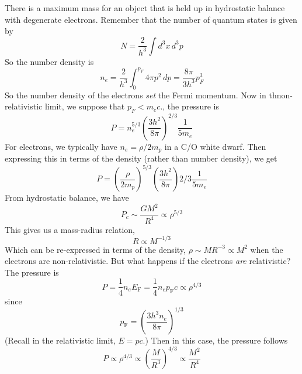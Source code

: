 \documentclass[10pt]{article}
\numberwithin{equation}{section}
\begin{document}
    There is a maximum mass for an object that is held up in
    hydrostatic balance with degenerate electrons. Remember that the
    number of quantum states is given by
    \begin{equation}
      \label{eq:307}
      N=\frac{2}{h^3}\int d^3x\,d^3p
    \end{equation}
    So the number density is
    \begin{equation}
      \label{eq:308}
      n_e=\frac{2}{h^3}\int_0^{p_F}4\pi p^2\,dp=\frac{8\pi}{3h^3}p_F^3
    \end{equation}
    So the number density of the electrons \emph{set} the Fermi
    momentum. Now in thnon-relativistic limit, we suppose that
    $p_F<m_ec$., the pressure is
    \begin{equation}
      \label{eq:309}
      P=n_e^{5/3}\left(\frac{3h^2}{8\pi}\right)^{2/3}\frac{1}{5m_e}
    \end{equation}
    For electrons, we typically have $n_e=\rho/2m_p$ in a C/O white
    dwarf. Then expressing this in terms of the density (rather than
    number density), we get
    \begin{equation}
      \label{eq:310}
      P=\left(\frac{\rho}{2m_p}\right)^{5/3}\left(\frac{3h^2}{8\pi}\right){2/3}\frac{1}{5m_e}
    \end{equation}
    From hydrostatic balance, we have
    \begin{equation}
      \label{eq:311}
      P_c\sim \frac{GM^2}{R^4}\propto \rho^{5/3}
    \end{equation}
    This gives us a mass-radius relation,
    \begin{equation}
      \label{eq:312}
      R\propto M^{-1/3}
    \end{equation}
    Which can be re-expressed in terms of the density, $\rho\sim
    MR^{-3}\propto M^2$ when the electrons are non-relativistic.  But
    what happens if the electrons \emph{are} relativistic? The
    pressure is
    \begin{equation}
      \label{eq:313}
      P=\frac{1}{4}n_e E_{\mathrm{F}}=\frac{1}{4}n_e p_{\mathrm{F}}
        c\propto \rho^{4/3}
    \end{equation}
    since 
    \begin{equation}
      \label{eq:314}
      p_{\mathrm{F}}=\left(\frac{3h^3n_e}{8\pi}\right)^{1/3}
    \end{equation}
    (Recall in the relativistic limit, $E=pc$.) Then in this case, the
    pressure follows
    \begin{equation}
      \label{eq:315}
      P\propto \rho^{4/3}\propto \left(\frac{M}{R^3}\right)^{4/3}\propto\frac{M^2}{R^4}
    \end{equation}
\end{document}
